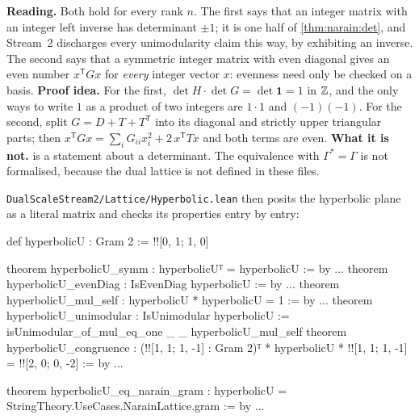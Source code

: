 \begin{leanbox}
\textbf{Reading.} Both hold for every rank $n$. The first says that an integer matrix with
an integer left inverse has determinant $\pm1$; it is one half of \cref{thm:narain:det}, and
Stream~2 discharges every unimodularity claim this way, by exhibiting an inverse. The second
says that a symmetric integer matrix with even diagonal gives an even number $x^{\mathsf T}Gx$
for \emph{every} integer vector $x$: evenness need only be checked on a basis. \textbf{Proof idea.} For the first, $\det H\cdot\det G=\det\mathbf 1=1$
in $\mathbb{Z}$, and the only ways to write $1$ as a product of two integers are $1\cdot1$ and
$(-1)(-1)$. For the second, split $G=D+T+T^{\mathsf T}$ into its diagonal and strictly upper
triangular parts; then $x^{\mathsf T}Gx=\sum_iG_{ii}x_i^2+2\,x^{\mathsf T}Tx$ and both terms are even.
\textbf{What it is not.}  is a statement about a determinant. The
equivalence with $\Gamma^*=\Gamma$ is not formalised, because the dual lattice is not defined
in these files.
\end{leanbox}

\texttt{DualScaleStream2/Lattice/Hyperbolic.lean} then posits the hyperbolic plane as a
literal matrix and checks its properties entry by entry:

\begin{leancode}
def hyperbolicU : Gram 2 := !![0, 1; 1, 0]

theorem hyperbolicU_symm : hyperbolicUᵀ = hyperbolicU := by ...
theorem hyperbolicU_evenDiag : IsEvenDiag hyperbolicU := by ...
theorem hyperbolicU_mul_self : hyperbolicU * hyperbolicU = 1 := by ...
theorem hyperbolicU_unimodular : IsUnimodular hyperbolicU :=
  isUnimodular_of_mul_eq_one _ _ hyperbolicU_mul_self
theorem hyperbolicU_congruence :
    (!![1, 1; 1, -1] : Gram 2)ᵀ * hyperbolicU * !![1, 1; 1, -1]
      = !![2, 0; 0, -2] := by ...

theorem hyperbolicU_eq_narain_gram :
    hyperbolicU = StringTheory.UseCases.NarainLattice.gram := by ...
\end{leancode}

